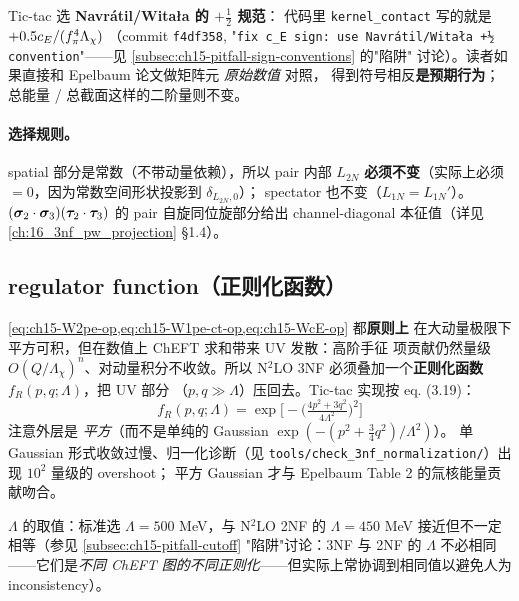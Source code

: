 Tic-tac 选 \textbf{Navrátil/Witała 的 \(+\tfrac{1}{2}\) 规范}：
代码里 \texttt{kernel\_contact} 写的就是 \(+0.5 c_E / (f_\pi^4 \Lambda_\chi)\)
（commit \texttt{f4df358}, "\texttt{fix c\_E sign: use Navrátil/Witała +½
convention}"——见 \cref{subsec:ch15-pitfall-sign-conventions} 的"陷阱"
讨论）。读者如果直接和 Epelbaum 论文做矩阵元 \emph{原始数值} 对照，
得到符号相反\textbf{是预期行为}；总能量 / 总截面这样的二阶量则不变。

\paragraph{选择规则。}
spatial 部分是常数（不带动量依赖），所以 pair 内部 \(L_{2N}\)
\textbf{必须不变}（实际上必须 \(= 0\)，因为常数空间形状投影到 \(\delta_{L_{2N},0}\)）；
spectator 也不变（\(L_{1N} = L_{1N}'\)）。\((\bm{\sigma}_2 \cdot \bm{\sigma}_3)
(\bm{\tau}_2 \cdot \bm{\tau}_3)\) 的 pair 自旋同位旋部分给出 channel-diagonal
本征值（详见 \cref{ch:16_3nf_pw_projection} \S 1.4）。

\subsection{regulator function（正则化函数）}
\label{subsec:ch15-regulator}

\cref{eq:ch15-W2pe-op,eq:ch15-W1pe-ct-op,eq:ch15-WcE-op} 都\textbf{原则上}
在大动量极限下平方可积，但在数值上 ChEFT 求和带来 UV 发散：高阶手征
项贡献仍然量级 \(O(Q/\Lambda_\chi)^n\)、对动量积分不收敛。所以 N\(^2\)LO 3NF
必须叠加一个\textbf{正则化函数} \(f_R(p, q; \Lambda)\)，把 UV 部分
（\(p, q \gg \Lambda\)）压回去。Tic-tac 实现按
\cite{Epelbaum2002NLO3NF} eq. (3.19)：
\begin{equation}
\label{eq:ch15-regulator}
\boxed{
\quad
f_R(p, q; \Lambda)
= \exp\Big[ -\Big( \tfrac{4 p^2 + 3 q^2}{4 \Lambda^2} \Big)^{\!2} \Big]
\quad
}
\end{equation}
注意外层是 \emph{平方}（而不是单纯的 Gaussian \(\exp(-(p^2+\tfrac{3}{4}q^2)/\Lambda^2)\)）。
单 Gaussian 形式收敛过慢、归一化诊断（见
\texttt{tools/check\_3nf\_normalization/}）出现 \(10^2\) 量级的 overshoot；
平方 Gaussian 才与 Epelbaum Table 2 的氚核能量贡献吻合。

\(\Lambda\) 的取值：标准选 \(\Lambda = 500\) MeV，与 N\(^2\)LO 2NF 的
\(\Lambda = 450\) MeV 接近但不一定相等（参见 \cref{subsec:ch15-pitfall-cutoff}
"陷阱"讨论：3NF 与 2NF 的 \(\Lambda\) 不必相同——它们是\emph{不同 ChEFT
图的不同正则化}——但实际上常协调到相同值以避免人为 inconsistency）。

